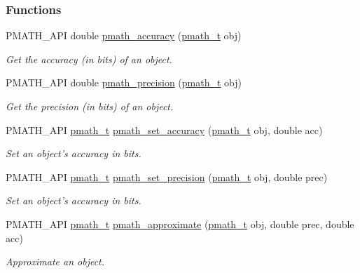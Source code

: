 \subsubsection*{Functions}
\begin{CompactItemize}
\item 
PMATH\_\-API double \hyperlink{group__numbers_g801920d9e9a6b4c04fa45e664a82dc10}{pmath\_\-accuracy} (\hyperlink{classpmath__t}{pmath\_\-t} obj)
\begin{CompactList}\small\item\em Get the accuracy (in bits) of an object. \item\end{CompactList}\item 
PMATH\_\-API double \hyperlink{group__numbers_g8c708b70a1cb0904900187f0c149ab7b}{pmath\_\-precision} (\hyperlink{classpmath__t}{pmath\_\-t} obj)
\begin{CompactList}\small\item\em Get the precision (in bits) of an object. \item\end{CompactList}\item 
PMATH\_\-API \hyperlink{classpmath__t}{pmath\_\-t} \hyperlink{group__numbers_g58e3c6cb9f505bb6c4544dd54de719f0}{pmath\_\-set\_\-accuracy} (\hyperlink{classpmath__t}{pmath\_\-t} obj, double acc)
\begin{CompactList}\small\item\em Set an object's accuracy in bits. \item\end{CompactList}\item 
PMATH\_\-API \hyperlink{classpmath__t}{pmath\_\-t} \hyperlink{group__numbers_g6e44e92e81d1b30567b58568e0151e2c}{pmath\_\-set\_\-precision} (\hyperlink{classpmath__t}{pmath\_\-t} obj, double prec)
\begin{CompactList}\small\item\em Set an object's accuracy in bits. \item\end{CompactList}\item 
PMATH\_\-API \hyperlink{classpmath__t}{pmath\_\-t} \hyperlink{group__numbers_g40f6a60efe25a7a13630d2d51911dc27}{pmath\_\-approximate} (\hyperlink{classpmath__t}{pmath\_\-t} obj, double prec, double acc)
\begin{CompactList}\small\item\em Approximate an object. \item\end{CompactList}\item 

\end{CompactItemize}

